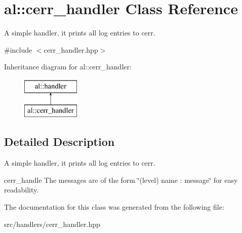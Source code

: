 \hypertarget{classal_1_1cerr__handler}{\section{al\-:\-:cerr\-\_\-handler \-Class \-Reference}
\label{classal_1_1cerr__handler}
}


\-A simple handler, it prints all log entries to cerr.  




{\ttfamily \#include $<$cerr\-\_\-handler.\-hpp$>$}

\-Inheritance diagram for al\-:\-:cerr\-\_\-handler\-:\begin{figure}[H]
\begin{center}
\leavevmode
\includegraphics[height=2.000000cm]{classal_1_1cerr__handler}
\end{center}
\end{figure}


\subsection{\-Detailed \-Description}
\-A simple handler, it prints all log entries to cerr. 

cerr\-\_\-handle \-The messages are of the form \char`\"{}(level) name \-: message\char`\"{} for easy readability. 

\-The documentation for this class was generated from the following file\-:\begin{DoxyCompactItemize}
\item 
src/handlers/cerr\-\_\-handler.\-hpp\end{DoxyCompactItemize}
